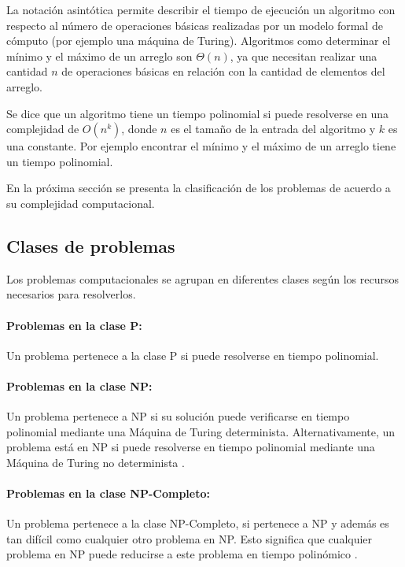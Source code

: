 \documentclass[12pt]{article}
\begin{document}
La notación asintótica permite describir el tiempo de ejecución un algoritmo con respecto al número de operaciones 
básicas realizadas por un modelo formal de cómputo (por ejemplo una máquina de Turing). Algoritmos como determinar el mínimo y el máximo de
un arreglo son $\Theta(n)$, ya que necesitan realizar una cantidad $n$ de operaciones básicas en relación con
la cantidad de elementos del arreglo.

Se dice que un algoritmo tiene un tiempo polinomial si puede resolverse en una complejidad de $O(n^k)$, donde $n$ es el tamaño de la entrada del algoritmo y $k$
es una constante. Por ejemplo encontrar el mínimo y el máximo de un arreglo tiene un tiempo polinomial.


En la próxima sección se presenta la clasificación de los problemas de acuerdo a su complejidad computacional.
\subsection{Clases de problemas}

Los problemas computacionales \cite{authomataTheory} se agrupan en diferentes clases según los recursos necesarios para resolverlos.

\paragraph{Problemas en la clase P:}
Un problema pertenece a la clase P si puede resolverse en tiempo polinomial.

\paragraph{Problemas en la clase NP:}
Un problema pertenece a NP si su solución puede verificarse en tiempo polinomial mediante una Máquina de Turing 
determinista. Alternativamente, un problema está en NP si puede resolverse en tiempo polinomial mediante una 
Máquina de Turing no determinista \cite{authomataTheory}.

\paragraph{Problemas en la clase NP-Completo:}
Un problema pertenece a la clase NP-Completo, si pertenece a NP y además es tan difícil como cualquier 
otro problema en NP. Esto significa que cualquier problema en NP puede reducirse a este problema en 
tiempo polinómico \cite{authomataTheory}.
\end{document}
